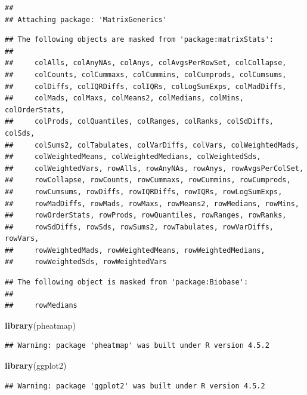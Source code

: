 \documentclass[
]{article}
\newenvironment{Shaded}{\begin{snugshade}}{\end{snugshade}}
\newcommand{\FunctionTok}[1]{\textcolor[rgb]{0.13,0.29,0.53}{\textbf{#1}}}
\newcommand{\NormalTok}[1]{#1}
\begin{document}
\begin{verbatim}
## 
## Attaching package: 'MatrixGenerics'
\end{verbatim}

\begin{verbatim}
## The following objects are masked from 'package:matrixStats':
## 
##     colAlls, colAnyNAs, colAnys, colAvgsPerRowSet, colCollapse,
##     colCounts, colCummaxs, colCummins, colCumprods, colCumsums,
##     colDiffs, colIQRDiffs, colIQRs, colLogSumExps, colMadDiffs,
##     colMads, colMaxs, colMeans2, colMedians, colMins, colOrderStats,
##     colProds, colQuantiles, colRanges, colRanks, colSdDiffs, colSds,
##     colSums2, colTabulates, colVarDiffs, colVars, colWeightedMads,
##     colWeightedMeans, colWeightedMedians, colWeightedSds,
##     colWeightedVars, rowAlls, rowAnyNAs, rowAnys, rowAvgsPerColSet,
##     rowCollapse, rowCounts, rowCummaxs, rowCummins, rowCumprods,
##     rowCumsums, rowDiffs, rowIQRDiffs, rowIQRs, rowLogSumExps,
##     rowMadDiffs, rowMads, rowMaxs, rowMeans2, rowMedians, rowMins,
##     rowOrderStats, rowProds, rowQuantiles, rowRanges, rowRanks,
##     rowSdDiffs, rowSds, rowSums2, rowTabulates, rowVarDiffs, rowVars,
##     rowWeightedMads, rowWeightedMeans, rowWeightedMedians,
##     rowWeightedSds, rowWeightedVars
\end{verbatim}

\begin{verbatim}
## The following object is masked from 'package:Biobase':
## 
##     rowMedians
\end{verbatim}

\begin{Shaded}
\begin{Highlighting}[]
\FunctionTok{library}\NormalTok{(pheatmap)}
\end{Highlighting}
\end{Shaded}

\begin{verbatim}
## Warning: package 'pheatmap' was built under R version 4.5.2
\end{verbatim}

\begin{Shaded}
\begin{Highlighting}[]
\FunctionTok{library}\NormalTok{(ggplot2)}
\end{Highlighting}
\end{Shaded}

\begin{verbatim}
## Warning: package 'ggplot2' was built under R version 4.5.2
\end{verbatim}
\end{document}
